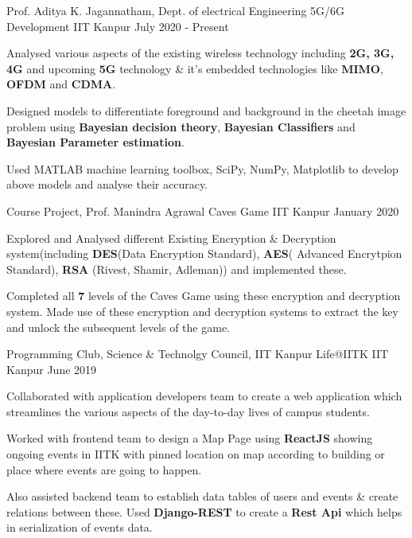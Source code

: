 \begin{cventries}
    
    \cventry
    {Prof. Aditya K. Jagannatham, Dept. of electrical Engineering}
    {5G/6G Development}
    {IIT Kanpur}
    {July 2020 - Present }
    {
      \begin{cvitems}
        \item {Analysed various aspects of the existing wireless technology including \textbf{2G, 3G, 4G} and upcoming \textbf{5G} technology \& it's embedded technologies like \textbf{ MIMO}, \textbf{OFDM} and \textbf{CDMA}.}
        \item {Designed models to differentiate foreground and background in the cheetah image problem using \textbf{Bayesian decision theory},\textbf{ Bayesian Classifiers} and\textbf{ Bayesian Parameter estimation}.}
        \item {Used MATLAB machine learning toolbox, SciPy, NumPy, Matplotlib to develop above models and analyse their accuracy.}
      \end{cvitems}
    } 
    
    \cventry
    {Course Project, Prof. Manindra Agrawal}
    {Caves Game}
    {IIT Kanpur}
    {January 2020}
    {
      \begin{cvitems}
        \item {Explored and Analysed different Existing  Encryption \& Decryption system(including\textbf{ DES}(Data Encryption Standard), \textbf{AES}( Advanced Encrytpion Standard),\textbf{ RSA} (Rivest, Shamir, Adleman)) and implemented these.}
        \item {Completed all \textbf{7} levels of the Caves Game using  these encryption and decryption system. Made use of these encryption and decryption systems to extract the key and unlock the subsequent levels of the game.}
      \end{cvitems}
    }
    
    \cventry
    {Programming Club, Science \& Technolgy Council, IIT Kanpur}
    {Life@IITK}
    {IIT Kanpur}
    {June 2019}
    {
      \begin{cvitems}
        \item {Collaborated with application developers team to create a web application which streamlines the various aspects of
        the day-to-day lives of campus students.}
        \item {Worked with frontend team to design a Map Page using \textbf{ReactJS} showing ongoing events in IITK with
        	pinned location on map according to building or place where events are going to happen. }
        \item{Also assisted backend team to establish data tables of users and events \& create relations between these. Used \textbf{Django-REST} to create a \textbf{Rest Api} which helps in serialization of events data.  }
      \end{cvitems}
    } 
    

\end{cventries}
